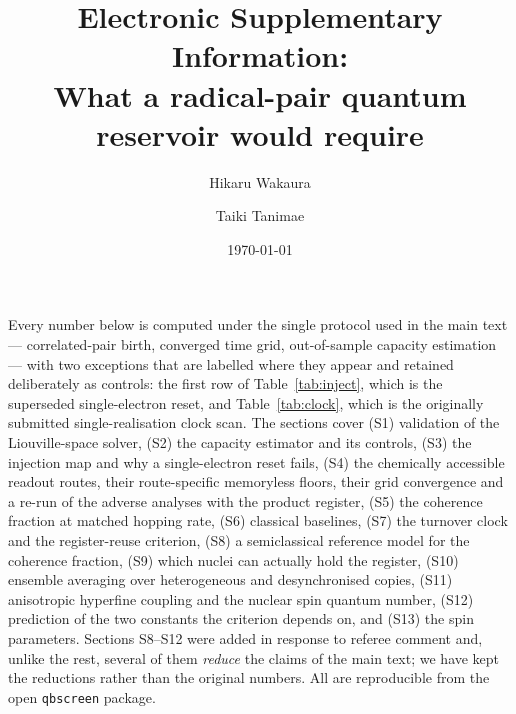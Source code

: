\documentclass[aps,prx,reprint,superscriptaddress,nofootinbib,floatfix]{revtex4-2}
\begin{document}
\title{Electronic Supplementary Information:\\
What a radical-pair quantum reservoir would require}

\author{Hikaru Wakaura}
\author{Taiki Tanimae}

\date{\today}

\maketitle

Every number below is computed under the single protocol used in the main text ---
correlated-pair birth, converged time grid, out-of-sample capacity estimation ---
with two exceptions that are labelled where they appear and retained deliberately
as controls: the first row of Table~\ref{tab:inject}, which is the superseded
single-electron reset, and Table~\ref{tab:clock}, which is the originally
submitted single-realisation clock scan. The sections cover
(S1) validation of the Liouville-space solver, (S2) the capacity estimator and its
controls, (S3) the injection map and why a single-electron reset fails, (S4) the
chemically accessible readout routes, their route-specific memoryless floors,
their grid convergence and a re-run of the adverse analyses with the product
register, (S5) the coherence fraction at matched hopping rate,
(S6) classical baselines, (S7) the turnover clock and the register-reuse
criterion, (S8) a semiclassical reference model for the coherence fraction,
(S9) which nuclei can actually hold the register, (S10) ensemble averaging over
heterogeneous and desynchronised copies, (S11) anisotropic hyperfine coupling and
the nuclear spin quantum number, (S12) prediction of the two constants the
criterion depends on, and (S13) the spin parameters. Sections
S8--S12 were added in response to referee comment and, unlike the rest, several of
them \emph{reduce} the claims of the main text; we have kept the reductions
rather than the original numbers. All are reproducible from the open
\texttt{qbscreen} package.
\end{document}
